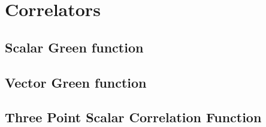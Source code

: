 \documentclass[a4paper]{report}
\begin{document}
\chapter{Correlators}

\section{Scalar Green function}
  
  
\section{Vector Green function}
  
\section{Three Point Scalar Correlation Function}
  

\appendix
  
  
  
  


\end{document}
